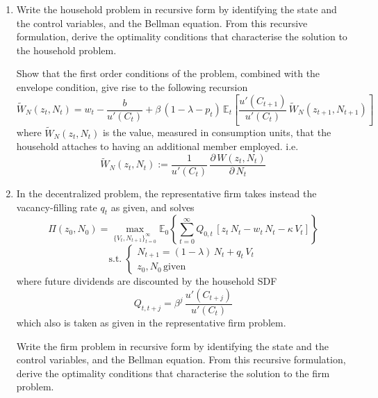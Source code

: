 \documentclass[a4paper,11pt]{article}
\begin{document}
\begin{enumerate}
\subsection*{Part 2: Decentralised Economy}
Consider now the decentralized problem. The representative family takes the job-finding rate $p_t$ as given, and solves
$$ W(z_0,N_0) = \max_{\{C_t,N_{t+1}\}_{t=0}^\infty}\mathbb{E}_0\left\{\sum_{t=0}^\infty \beta^t \left[u(C_t) - b\,N_t\right]\right\} $$
$$ \mathrm{s.t.}\; 
\begin{cases}
C_t = w_t\,N_t 	\\
N_{t+1} = (1-\lambda)\,N_t + p_t\,(1-N_t)	\\
z_0,N_0\,\text{given}
\end{cases}
$$

\item  Write the household problem in recursive form by identifying the state and the control variables, and the Bellman equation. From this recursive formulation, derive the optimality conditions that characterise the solution to the household problem.

Show that the first order conditions of the problem, combined with the envelope condition, give rise to the following recursion
$$ \widetilde{W}_N(z_{t},N_{t}) = w_t - \frac{b}{u'(C_t)} + \beta\,\left(1-\lambda - p_t\right)\,\mathbb{E}_t\left[\frac{u'(C_{t+1})}{u'(C_t)}\, \widetilde{W}_N(z_{t+1},N_{t+1})\right] $$
where $\widetilde{W}_N(z_{t},N_{t})$ is the value, measured in consumption units, that the household attaches to having an additional member employed. i.e.
$$ \widetilde{W}_N(z_{t},N_{t}) := \frac{1}{u'(C_t)}\,\frac{\partial\,W(z_{t},N_{t})}{\partial\,N_t} $$

\item In the decentralized problem, the representative firm takes instead the vacancy-filling rate $q_t$ as given, and solves
$$ \Pi(z_0,N_0) = \max_{\{V_t,N_{t+1}\}_{t=0}^\infty}\mathbb{E}_0\left\{\sum_{t=0}^\infty Q_{0,t}\,\left[z_t\,N_t - w_t\,N_t - \kappa\,V_t\right]\right\} $$
$$ \mathrm{s.t.}\; 
\begin{cases}
N_{t+1} = (1-\lambda)\,N_t + q_t\,V_t	\\
z_0,N_0\,\text{given}
\end{cases}
$$
where future dividends are discounted by the household SDF
$$ Q_{t,t+j} = \beta^j\,\frac{u'(C_{t+j})}{u'(C_t)} $$
which also is taken as given in the representative firm problem.

Write the firm problem in recursive form by identifying the state and the control variables, and the Bellman equation. From this recursive formulation, derive the optimality conditions that characterise the solution to the firm problem.


\end{enumerate}
\end{document}
